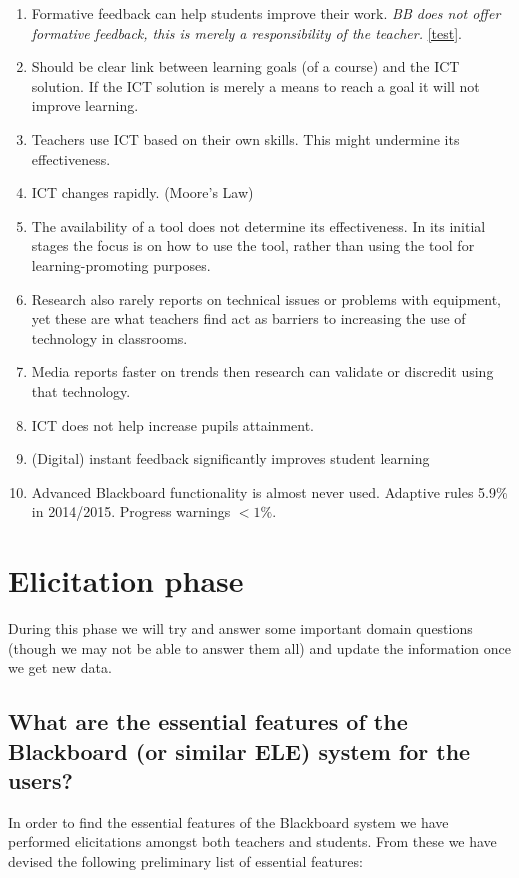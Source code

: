 \begin{enumerate}                                                           
	\item \label{df:formative_feedback}Formative feedback can help students improve their work.\cite{ict_study} \textit{BB does not offer formative feedback, this is merely a responsibility of the teacher.} \ref{test}.
	\item \label{df:link} Should be clear link between learning goals (of a course) and the ICT solution. If the ICT solution is merely a means to reach a goal it will not improve learning. \cite{ict_study}
	\item \label{df:teacher_skills} Teachers use ICT based on their own skills. This might undermine its effectiveness.\cite{ict_study} 
	\item ICT changes rapidly. (Moore's Law)
	\item The availability of a tool does not determine its effectiveness. In its initial stages the focus is on how to use the tool, rather than using the tool for learning-promoting purposes. \cite{ict_study}
	\item Research also rarely reports on technical issues or problems with equipment, yet these are what teachers find act as barriers to increasing the use of technology in classrooms.\cite{ict_study} 
	\item Media reports faster on trends then research can validate or discredit using that technology.\cite{ict_study} 
	\item ICT does not help increase pupils attainment.\cite{ict_study}
	\item (Digital) instant feedback significantly improves student learning \cite{clicker}
	\item Advanced Blackboard functionality is almost never used. Adaptive rules 5.9$\%$ in 2014/2015. Progress warnings $< 1 \%$. \cite{richard_report}
\end{enumerate}


\chapter{Elicitation phase}\label{ch:elicitation}
During this phase we will try and answer some important domain questions (though we may not be able to answer them all) and update the information once we get new data.

\section{What are the essential features of the Blackboard (or similar ELE) system for the users?}
\label{sec:essential_features}
In order to find the essential features of the Blackboard system we have performed elicitations amongst both teachers and students. From these we have devised the following preliminary list of essential features:

